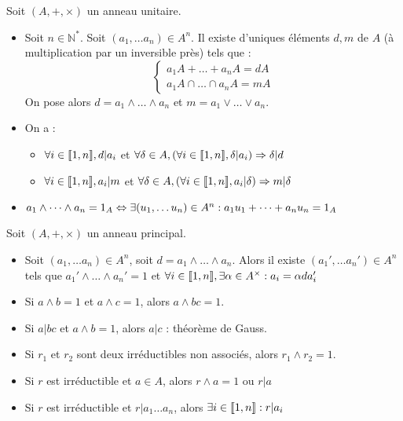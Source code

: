 \begin{prop} Soit $(A,+,\times)$ un anneau unitaire.\begin{itemize}
    \item Soit $n\in\mathbb{N}^*$. Soit $(a_1,\dots a_n)\in A^n$. Il existe d'uniques éléments $d,m$ de $A$ (à multiplication par un inversible près) tels que :
        \[ \left\{\begin{array}{l} a_1A+\dots +a_nA = dA \\ a_1A\cap\dots\cap a_nA = mA\end{array}\right. \]
        On pose alors $d = a_1\wedge\dots\wedge a_n$ et $m=a_1\vee\dots\vee a_n$.
    \item On a :\begin{itemize}
            \item $\forall i\in\llbracket 1, n \rrbracket, d|a_i$ et $\forall \delta\in A, (\forall i\in\llbracket 1, n \rrbracket, \delta|a_i)\Rightarrow \delta|d$
            \item $\forall i\in\llbracket 1, n \rrbracket, a_i|m$ et $\forall \delta\in A, (\forall i\in\llbracket 1, n \rrbracket, a_i|\delta)\Rightarrow m|\delta$
        \end{itemize}
    \item $a_1\wedge\dots\wedge a_n = 1_A \Leftrightarrow \exists (u_1, \dots u_n)\in A^n: a_1u_1+\dots+ a_nu_n = 1_A$
\end{itemize}\end{prop}

\begin{prop} Soit $(A,+,\times)$ un anneau principal.\begin{itemize}
    \item Soit $(a_1,\dots a_n)\in A^n$, soit $d=a_1\wedge\dots\wedge a_n$. Alors il existe $(a_1',\dots a_n')\in A^n$ tels que $a_1'\wedge\dots\wedge a_n'=1$ et $\forall i\in\llbracket 1, n \rrbracket, \exists \alpha\in A^\times: a_i = \alpha d a_i'$
    \item Si $a\wedge b=1$ et $a\wedge c=1$, alors $a\wedge bc = 1$.
    \item Si $a|bc$ et $a\wedge b = 1$, alors $a|c$ : théorème de Gauss.
    \item Si $r_1$ et $r_2$ sont deux irréductibles non associés, alors $r_1\wedge r_2=1$.
    \item Si $r$ est irréductible et $a\in A$, alors $r\wedge a = 1$ ou $r|a$
    \item Si $r$ est irréductible et $r|a_1\dots a_n$, alors $\exists i\in\llbracket 1, n \rrbracket:r|a_i$
\end{itemize}\end{prop}

